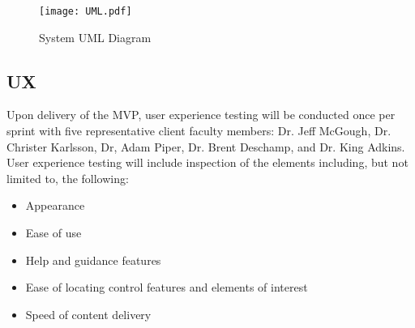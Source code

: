 	\begin{figure}[H]
	 	\centering
		\texttt{[image: UML.pdf]}
		\caption{System UML Diagram} 
	 	\label{fig:SystemUML}	
	\end{figure}
    
\subsection{UX}

Upon delivery of the MVP, user experience testing will be conducted once per sprint with five representative client faculty members: Dr. Jeff McGough, Dr. Christer Karlsson, Dr, Adam Piper, Dr. Brent Deschamp, and Dr. King Adkins. User experience testing will include inspection of the elements including, but not limited to, the following:

\begin{itemize}
	\item Appearance
	\item Ease of use
	\item Help and guidance features
	\item Ease of locating control features and elements of interest
	\item Speed of content delivery 
\end{itemize}




